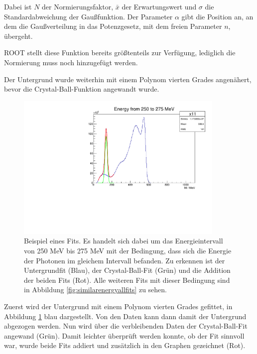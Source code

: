 \documentclass[a4paper,11pt,oneside,final,german,openbib,pdftex]{scrbook}
\begin{document}
{Dabei ist $N$ der Normierungsfaktor, $\bar{x}$ der Erwartungswert und $\sigma$ die Standardabweichung der Gau{\ss}funktion. Der Parameter $\alpha$ gibt die Position an, an dem die Gau{\ss}verteilung in das Potenzgesetz, mit dem freien Parameter $n$, \"ubergeht\cite{NBI15}. 

ROOT stellt diese Funktion bereits gr\"o{\ss}tenteils zur Verf\"ugung, lediglich die Normierung muss noch hinzugef\"ugt werden.

Der Untergrund wurde weiterhin mit einem Polynom vierten Grades angen\"ahert, bevor die Crystal-Ball-Funktion angewandt wurde.

\begin{figure}[h!]
	\begin{center}
		\includegraphics[width=100mm]{NewCalib/Strahlzeit2014/20171904RealIntervalFitExample}
		
		\caption[Strahlzeit: Beispielfit f\"ur die Crystal-Ball-Fitfunktion]{Beispiel eines Fits. Es handelt sich dabei um das Energieintervall von 250 MeV bis 275 MeV mit der Bedingung, dass sich die Energie der Photonen im gleichem Intervall befanden.
			Zu erkennen ist der Untergrundfit (Blau), der Crystal-Ball-Fit (Gr\"un) und die Addition der beiden Fits (Rot). Alle weiteren Fits mit dieser Bedingung sind in Abbildung \ref{fig:similarenergyallfits} zu sehen.
		}
		\label{fig:fitexampleenergyinterval0903}	
	\end{center}
\end{figure}

Zuerst wird der Untergrund mit einem Polynom vierten Grades gefittet, in Abbildung \ref{fig:fitexampleenergyinterval0903} blau dargestellt. Von den Daten kann dann damit der Untergrund abgezogen werden. Nun wird \"uber die verbleibenden Daten der Crystal-Ball-Fit angewand (Gr\"un). Damit leichter \"uberpr\"uft werden konnte, ob der Fit sinnvoll war, wurde beide Fits addiert und zus\"atzlich in den Graphen gezeichnet (Rot).
\newpage

}
\end{document}

